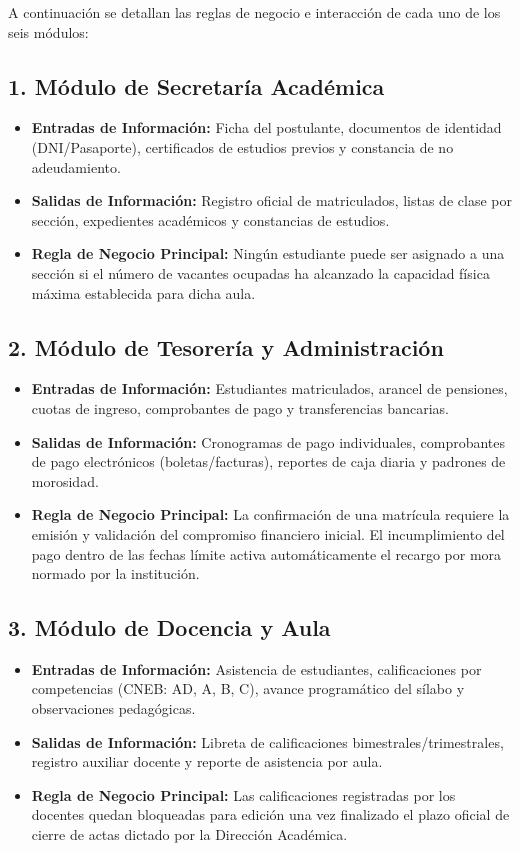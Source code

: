 \documentclass[12pt,a4paper,oneside]{report}
\begin{document}
A continuación se detallan las reglas de negocio e interacción de cada uno de los seis módulos:

\subsection{1. Módulo de Secretaría Académica}
\begin{itemize}
    \item \textbf{Entradas de Información:} Ficha del postulante, documentos de identidad (DNI/Pasaporte), certificados de estudios previos y constancia de no adeudamiento.
    \item \textbf{Salidas de Información:} Registro oficial de matriculados, listas de clase por sección, expedientes académicos y constancias de estudios.
    \item \textbf{Regla de Negocio Principal:} Ningún estudiante puede ser asignado a una sección si el número de vacantes ocupadas ha alcanzado la capacidad física máxima establecida para dicha aula.
\end{itemize}

\subsection{2. Módulo de Tesorería y Administración}
\begin{itemize}
    \item \textbf{Entradas de Información:} Estudiantes matriculados, arancel de pensiones, cuotas de ingreso, comprobantes de pago y transferencias bancarias.
    \item \textbf{Salidas de Información:} Cronogramas de pago individuales, comprobantes de pago electrónicos (boletas/facturas), reportes de caja diaria y padrones de morosidad.
    \item \textbf{Regla de Negocio Principal:} La confirmación de una matrícula requiere la emisión y validación del compromiso financiero inicial. El incumplimiento del pago dentro de las fechas límite activa automáticamente el recargo por mora normado por la institución.
\end{itemize}

\subsection{3. Módulo de Docencia y Aula}
\begin{itemize}
    \item \textbf{Entradas de Información:} Asistencia de estudiantes, calificaciones por competencias (CNEB: AD, A, B, C), avance programático del sílabo y observaciones pedagógicas.
    \item \textbf{Salidas de Información:} Libreta de calificaciones bimestrales/trimestrales, registro auxiliar docente y reporte de asistencia por aula.
    \item \textbf{Regla de Negocio Principal:} Las calificaciones registradas por los docentes quedan bloqueadas para edición una vez finalizado el plazo oficial de cierre de actas dictado por la Dirección Académica.
\end{itemize}
\end{document}
